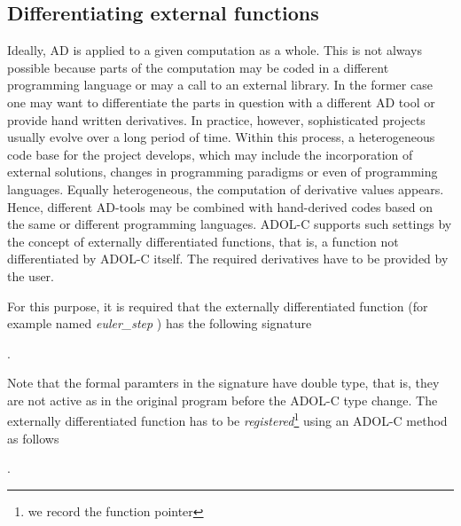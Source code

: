 \documentclass[11pt,twoside]{article}
\begin{document}
\subsection{Differentiating external functions}
%
Ideally, AD is applied to a given computation as a whole.
This is not always possible because parts of the computation may 
be coded in a different programming language or may a call to 
an external library. 
In the former case one may want to differentiate the parts in 
question with a different AD tool or provide hand written derivatives. 
In practice, however, sophisticated projects usually evolve over a long period of time.
Within this process, a heterogeneous code base for the project
develops, which may include the incorporation of external solutions,
changes in programming paradigms or even of programming languages.
Equally heterogeneous, the computation of derivative values appears.
Hence, different \mbox{AD-tools} may be combined with hand-derived
codes based on the same or different programming languages. 
ADOL-C supports such settings by the concept of externally
differentiated functions, that is, a function
not differentiated by ADOL-C itself. The required derivatives
have to be provided by the user.

For this purpose, it is required that the externally differentiated
function (for example named {\sf\em euler\_step} ) has the following signature
\smallskip

\noindent
\hspace*{2cm}{\sf int euler\_step(int n, double *x, int m, double *y);} .
\medskip

\noindent
Note that the formal paramters in the signature have {\sf double} type, that is, 
they are not active as in the original program before the ADOL-C type change.
The externally differentiated function has to
be {\em registered}\footnote{we record the function pointer} using an \mbox{ADOL-C} method as follows
\smallskip

\noindent
\hspace*{2cm}{\sf ext\_diff\_fct *edf = reg\_ext\_fct(euler\_step);} .
\smallskip
\end{document}

